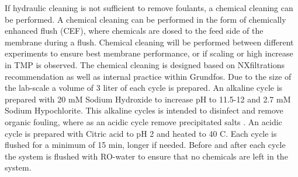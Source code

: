 If hydraulic cleaning is not sufficient to remove foulants, a chemical cleaning can be performed. 
A chemical cleaning can be performed in the form of chemically enhanced flush (CEF), where chemicals are dosed to the feed side of the membrane during a flush.  \citep{NXfiltration_operation_manual} 
Chemical cleaning will be performed between different experiments to ensure best membrane performance, or if scaling or high increase in TMP is observed. 
The chemical cleaning is designed based on NXfiltrations recommendation \citep{NXfiltration_operation_manual} as well as internal practice within Grundfos. 
Due to the size of the lab-scale a volume of 3 liter of each cycle is prepared. 
An alkaline cycle is prepared with 20 mM Sodium Hydroxide to increase pH to 11.5-12 and 2.7 mM Sodium Hypochlorite.  
This alkaline cycles is intended to disinfect and  remove organic fouling, where as an acidic cycle remove precipitated salts  \citep{NXfiltration_operation_manual}. 
An acidic cycle is prepared with %
Citric acid to pH 2 and heated to 40 \textdegree{}C. 
Each cycle is flushed for a minimum of 15 min, longer if needed. 
Before and after each cycle the system is flushed with RO-water to ensure that no chemicals are left in the system. 








